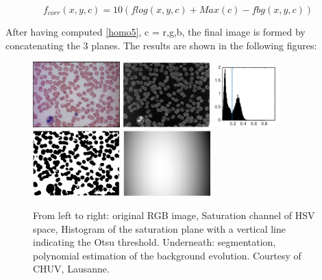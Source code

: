 {	\begin{equation}\label{homo5}
	f_{corr} (x, y, c) = 10(flog (x,y,c)+M ax(c)-fbg (x,y,c))
	\end{equation}
	
	After having computed \ref{homo5}, c = r,g,b, the final image is formed by concatenating the 3 planes. The results are shown in the following figures:
	\begin{figure}[h]
		\centering
		\includegraphics[width=0.3\textwidth]{images/homo/homo1}
		\includegraphics[width=0.3\textwidth]{images/homo/homo2}
		\includegraphics[width=0.23\textwidth]{images/homo/homo3}
		\includegraphics[width=0.3\textwidth]{images/homo/homo4}
		\includegraphics[width=0.3\textwidth]{images/homo/homo5}
		\caption[Homomorphic filter example.]{\label{f1_homo} From left to right: original RGB image, Saturation channel of HSV space, Histogram of the saturation plane with a vertical line indicating the Otsu threshold.
			Underneath:  segmentation, polynomial estimation of the background evolution. Courtesy of CHUV, Lausanne.}
	\end{figure}
	
}
